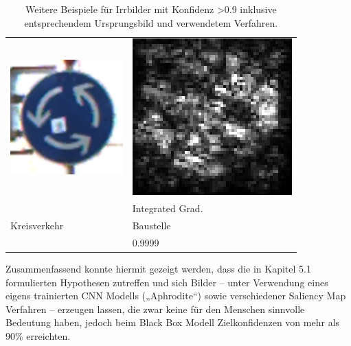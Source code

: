 \begin{table}
\begin{tabular}{p{4.5cm}p{4.5cm}}
		\includegraphics[height=4.4cm]{Images/AnPe/04709} &\includegraphics[width=\linewidth]{Images/AnPe/04709_int_grad}  \\
		& Integrated Grad.\\
		Kreisverkehr &Baustelle \\
		& 0.9999
	\end{tabular}
	\caption{Weitere Beispiele für Irrbilder mit Konfidenz >0.9 inklusive entsprechendem Ursprungsbild und verwendetem Verfahren.}
\label{tab:sal2}
\end{table}


Zusammenfassend konnte hiermit gezeigt werden, dass die in Kapitel 5.1 formulierten Hypothesen zutreffen und sich Bilder – unter Verwendung eines eigens trainierten \ac{CNN} Modells („Aphrodite“) sowie verschiedener Saliency Map Verfahren – erzeugen lassen, die zwar keine für den Menschen sinnvolle Bedeutung haben, jedoch beim Black Box Modell Zielkonfidenzen von mehr als 90\% erreichten.


